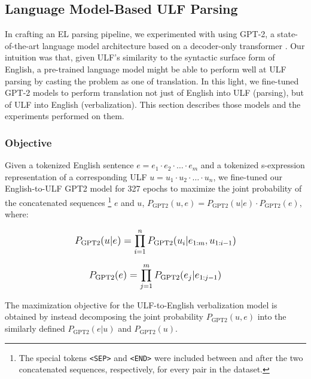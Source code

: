 \subsection{Language Model-Based ULF Parsing}
\label{sec:ulf-gpt2}
In crafting an EL parsing pipeline, we experimented with using GPT-2, a state-of-the-art language model architecture based on a decoder-only transformer \citep{Radford2019LanguageMA}. Our intuition was that, given ULF's similarity to the syntactic surface form of English, a pre-trained language model might be able to perform well at ULF parsing by casting the problem as one of translation. In this light, we fine-tuned GPT-2 models to perform translation not just of English into ULF (parsing), but of ULF into English (verbalization). This section describes those models and the experiments performed on them.
\subsubsection{Objective}
Given a tokenized English sentence $e = e_{1} \cdot e_{2} \cdot \ldots \cdot e_{m}$ and a tokenized s-expression representation of a corresponding ULF $u = u_{1} \cdot u_{2} \cdot \ldots \cdot u_{n}$, we fine-tuned our English-to-ULF GPT2 model for 327 epochs to maximize the joint probability of the concatenated sequences \footnote{The special tokens \texttt{<SEP>} and \texttt{<END>} were included between and after the two concatenated sequences, respectively, for every pair in the dataset.} $e$ and $u$, $P_{\textrm{GPT2}}(u,e) = P_{\textrm{GPT2}}(u|e) \cdot P_{\textrm{GPT2}}(e)$, where:

\vspace{3mm}

$$\mathlarger{P_{\textrm{GPT2}}(u|e) = \prod_{i=1}^{n} P_{\textrm{GPT2}}(u_{i} | e_{1:m},u_{1:i-1})}$$
\vspace{1mm}

$$\mathlarger{P_{\textrm{GPT2}}(e) = \prod_{j=1}^{m} P_{\textrm{GPT2}}(e_{j} | e_{1:j-1})}$$

\vspace{3mm}

The maximization objective for the ULF-to-English verbalization model is obtained by instead decomposing the joint probability $P_{\textrm{GPT2}}(u,e)$ into the similarly defined $P_{\textrm{GPT2}}(e|u)$ and $P_{\textrm{GPT2}}(u)$.

